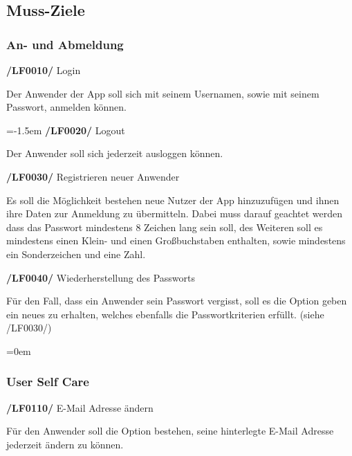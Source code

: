 \documentclass[11pt,a4paper]{report}
\begin{document}
\subsection{Muss-Ziele}
\subsubsection{An- und Abmeldung}

\textbf{/LF0010/} Login
\par
\begingroup
\leftskip=1cm
\noindent Der Anwender der App soll sich mit seinem Usernamen, sowie mit seinem Passwort, anmelden können.\\
\par
\endgroup

\leftskip=-1.5em
\textbf{/LF0020/} Logout
\par
\begingroup
\leftskip=1cm
\noindent Der Anwender soll sich jederzeit ausloggen können.\\
\par
\endgroup

\textbf{/LF0030/} Registrieren neuer Anwender
\par
\begingroup
\leftskip=1cm
\noindent Es soll die Möglichkeit bestehen neue Nutzer der App hinzuzufügen und ihnen ihre Daten zur Anmeldung zu übermitteln.
Dabei muss darauf geachtet werden dass das Passwort mindestens 8 Zeichen lang sein soll, des Weiteren soll es mindestens einen Klein- und einen Großbuchstaben enthalten, sowie mindestens ein Sonderzeichen und eine Zahl.\\
\par
\endgroup

\textbf{/LF0040/} Wiederherstellung des Passworts
\par
\begingroup
\leftskip=1cm
\noindent Für den Fall, dass ein Anwender sein Passwort vergisst, soll es die Option geben ein neues zu erhalten, welches ebenfalls die Passwortkriterien erfüllt.
(siehe /LF0030/)\\
\par
\endgroup

\leftskip=0em
\subsubsection{User Self Care}

\textbf{/LF0110/} E-Mail Adresse ändern
\par
\begingroup
\leftskip=1cm
\noindent Für den Anwender soll die Option bestehen, seine hinterlegte E-Mail Adresse jederzeit ändern zu können.\\
\par
\endgroup
\end{document}
